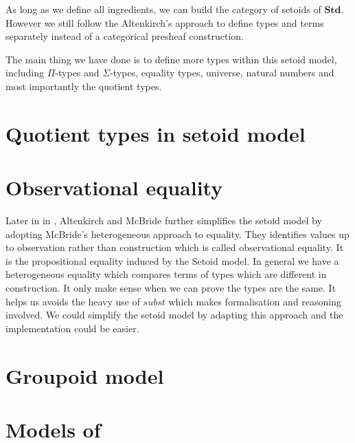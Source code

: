 As long as we define all ingredients, we can build the category of setoids of $\textbf{Std}$. However we still follow the Altenkirch's approach to define types and terms separately instead of a categorical presheaf construction.

The main thing we have done is to define more types within this setoid model, including $\Pi$-types and $\Sigma$-types, equality types, universe, natural numbers and most importantly the quotient types.






\section{Quotient types in setoid model}





\section{Observational equality}


Later in in \cite{alti:ott-conf}, Altenkirch and McBride further
simplifies the setoid model by adopting McBride's heterogeneous
approach to equality. They identifies values up to observation rather than
  construction which is called observational equality. It is the
  propositional equality induced by the Setoid model.  In general we have a heterogeneous equality which
  compares terms of types which are different in construction. It only
  make sense when we can prove the types are the same. It helps us
  avoids the heavy use of $subst$ which makes formalisation and
  reasoning involved. We could simplify the setoid model by adapting this
  approach and the implementation could be easier.











\section{Groupoid model}




\section{Models of \hott}




